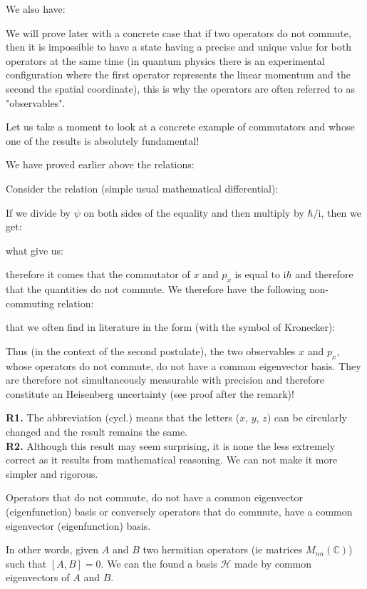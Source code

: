	We also have:
	
	We will prove later with a concrete case that if two operators do not commute, then it is impossible to have a state having a precise and unique value for both operators at the same time (in quantum physics there is an experimental configuration where the first operator represents the linear momentum and the second the spatial coordinate), this is why the operators are often referred to as "observables".
	
	Let us take a moment to look at a concrete example of commutators and whose one of the results is absolutely fundamental!

	We have proved earlier above the relations:
	
	Consider the relation (simple usual mathematical differential):
	
	If we divide by $\psi$ on both sides of the equality and then multiply by $\hbar/\mathrm{i}$, then we get:
	
	what give us:
	
	therefore it comes that the commutator of $x$ and $p_x$ is equal to $\mathrm{i}\hbar$ and therefore that the quantities do not commute. We therefore have the following non-commuting relation\label{second quantum uncertainty relation}:
	
	that we often find in literature in the form (with the symbol of Kronecker):
	
	Thus (in the context of the second postulate), the two observables $x$ and $p_x$, whose operators do not commute, do not have a common eigenvector basis. They are therefore not simultaneously measurable with precision and therefore constitute an Heisenberg uncertainty (see proof after the remark)!
	\begin{tcolorbox}[title=Remarks,colframe=black,arc=10pt]
	\textbf{R1.} The abbreviation (cycl.) means that the letters ($x$, $y$, $z$) can be circularly changed and the result remains the same.\\
	
	\textbf{R2.} Although this result may seem surprising, it is none the less extremely correct as it results from mathematical reasoning. We can not make it more simpler and rigorous.\\
	\end{tcolorbox}
	\begin{theorem}
	Operators that do not commute, do not have a common eigenvector (eigenfunction) basis or conversely operators that do commute, have a common eigenvector (eigenfunction) basis.
	
	In other words, given $A$ and $B$ two hermitian operators (ie matrices $M_{nn}(\mathbb{C})$) such that $[A,B]=0$. We can the found a basis $\mathcal{H}$ made by common eigenvectors of $A$ and $B$.
	\end{theorem}


